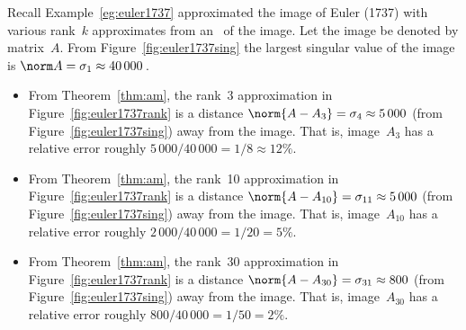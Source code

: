 \begin{example} \label{eg:}
Recall Example~\ref{eg:euler1737} approximated the image of Euler (1737) with various rank~\(k\) approximates from an \svd\ of the image.
Let the image be denoted by matrix~\(A\).
From Figure~\ref{fig:euler1737sing} the largest singular value of the image is \(\norm A=\sigma_1\approx40\,000\)\,.
\begin{itemize}
\item From  Theorem~\ref{thm:am}, the rank~3 approximation in Figure~\ref{fig:euler1737rank} is a distance \(\norm{A-A_3}=\sigma_4\approx 5\,000\) (from Figure~\ref{fig:euler1737sing}) away from the image.  
That is, image~\(A_3\) has a relative error roughly \(5\,000/40\,000=1/8\approx 12\%\).
\item From  Theorem~\ref{thm:am}, the rank~10 approximation in Figure~\ref{fig:euler1737rank} is a distance \(\norm{A-A_{10}}=\sigma_{11}\approx 5\,000\) (from Figure~\ref{fig:euler1737sing}) away from the image.  
That is, image~\(A_{10}\) has a relative error roughly \(2\,000/40\,000=1/20= 5\%\). 
\item From  Theorem~\ref{thm:am}, the rank~30 approximation in Figure~\ref{fig:euler1737rank} is a distance \(\norm{A-A_{30}}=\sigma_{31}\approx 800\) (from Figure~\ref{fig:euler1737sing}) away from the image.  
That is, image~\(A_{30}\) has a relative error roughly \(800/40\,000=1/50= 2\%\). 
\end{itemize}
\end{example}


